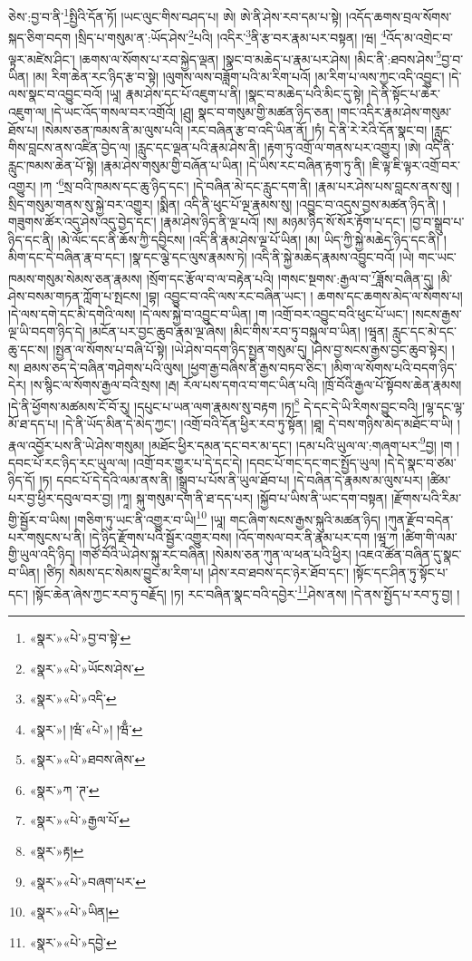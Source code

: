 ཅེས་:བྱ་བ་ནི་\footnote{«སྣར་»«པེ་»བྱ་བ་སྟེ་}སྤྱིའི་དོན་ཏོ། །ཡང་ལུང་གིས་བཤད་པ། ཨེ། ཨེ་ནི་ཤེས་རབ་དམ་པ་སྟེ། །འདོད་ཆགས་བྲལ་སོགས་སྐད་ཅིག་བདག །སྲིད་པ་གསུམ་ན་:ཡོད་ཤེས་\footnote{«སྣར་»«པེ་»ཡོངས་ཤེས་}པའི། །འདིར་\footnote{«སྣར་»«པེ་»འདི་}ནི་རྩ་བར་རྣམ་པར་བསྟན། །ཝ། \footnote{«སྣར་»། །ཝཾ་«པེ་»། །ཝྃ་}འོད་མ་འགྲེང་བ་ལྟར་མཛེས་ཤིང་། །ཆགས་ལ་སོགས་པ་རབ་སྐྱེད་ལྡན། །སྣང་བ་མཆེད་པ་རྣམ་པར་ཤེས། །མིང་ནི་:ཐབས་ཤེས་\footnote{«སྣར་»«པེ་»ཐབས་ཞེས་}བྱ་བ་ཡིན། །མ། རིག་ཆེན་རང་ཉིད་རྩ་བ་སྟེ། །ལུགས་ལས་བཟློག་པའི་མ་རིག་པའོ། །མ་རིག་པ་ལས་ཀྱང་འདི་འབྱུང་། །དེ་ལས་སྣང་བ་འབྱུང་བའོ། །ཡཱ། རྣམ་ཤེས་དང་པོ་འཇུག་པ་ནི། །སྣང་བ་མཆེད་པའི་མིང་དུ་སྟེ། །དེ་ནི་སྟོང་པ་ཆེར་འཇུག་ལ། །དེ་ཡང་འོད་གསལ་བར་འགྲོའོ། །ཤྲུ། སྣང་བ་གསུམ་གྱི་མཚན་ཉིད་ཅན། །གང་འདིར་རྣམ་ཤེས་གསུམ་ཐོས་པ། །སེམས་ཅན་ཁམས་ནི་མ་ལུས་པའི། །རང་བཞིན་རྩ་བ་འདི་ཡིན་ནོ། །ཏཾ། དེ་ནི་རེ་རེའི་དོན་སྣང་བ། །རླུང་གིས་བླངས་ནས་འཛིན་བྱེད་ལ། །རླུང་དང་ལྡན་པའི་རྣམ་ཤེས་ནི། །རྟག་ཏུ་འགྲོ་ལ་གནས་པར་འགྱུར། །ཨེ། འདི་ནི་རླུང་ཁམས་ཆེན་པོ་སྟེ། །རྣམ་ཤེས་གསུམ་གྱི་བཞོན་པ་ཡིན། །དེ་ཡིས་རང་བཞིན་རྟག་ཏུ་ནི། །ཇི་ལྟ་ཇི་ལྟར་འགྲོ་བར་འགྱུར། །ཀ ་\footnote{«སྣར་»ཀ ་ཊ་}སྲ་བའི་ཁམས་དང་ཆུ་ཉིད་དང་། །དེ་བཞིན་མེ་དང་རླུང་དག་ནི། །རྣམ་པར་ཤེས་པས་བླངས་ནས་སུ། །སྲིད་གསུམ་གནས་སུ་སྐྱེ་བར་འགྱུར། །སྨིན། འདི་ནི་ཕུང་པོ་ལྔ་རྣམས་སུ། །འབྱུང་བ་འདུས་བྱས་མཚན་ཉིད་ནི། །གཟུགས་ཚོར་འདུ་ཤེས་འདུ་བྱེད་དང་། །རྣམ་ཤེས་ཉིད་ནི་ལྔ་པའོ། །ས། མཉམ་ཉིད་སོ་སོར་རྟོག་པ་དང་། །བྱ་བ་སྒྲུབ་པ་ཉིད་དང་ནི། །མེ་ལོང་དང་ནི་ཆོས་ཀྱི་དབྱིངས། །འདི་ནི་རྣམ་ཤེས་ལྔ་པོ་ཡིན། །མ། ཡིད་ཀྱི་སྐྱེ་མཆེད་ཉིད་དང་ནི། །མིག་དང་དེ་བཞིན་རྣ་བ་དང་། །སྣ་དང་ལྕེ་དང་ལུས་རྣམས་ཏེ། །འདི་ནི་སྐྱེ་མཆེད་རྣམས་འབྱུང་བའོ། །ཡེ། གང་ཡང་ཁམས་གསུམ་སེམས་ཅན་རྣམས། །སྲོག་དང་རྩོལ་བ་ལ་བརྟེན་པའི། །གསང་སྔགས་:རྒྱལ་བ་\footnote{«སྣར་»«པེ་»རྒྱལ་པོ་}ཟློས་བཞིན་དུ། །མི་ཤེས་བསམ་གཏན་ཀློག་པ་སྤངས། །བྷ། འབྱུང་བ་འདི་ལས་རང་བཞིན་ཡང་། །
ཆགས་དང་ཆགས་མེད་ལ་སོགས་པ། །དེ་ལས་དགེ་དང་མི་དགེའི་ལས། །དེ་ལས་སྐྱེ་བ་འབྱུང་བ་ཡིན། །ག །འགྲོ་བར་འབྱུང་བའི་ཕུང་པོ་ཡང་། །སངས་རྒྱས་ལྔ་ཡི་བདག་ཉིད་དེ། །མངོན་པར་བྱང་ཆུབ་རྣམ་ལྔ་ཞེས། །མིང་གིས་རབ་ཏུ་བསྐུལ་བ་ཡིན། །ཝཱན། རླུང་དང་མེ་དང་ཆུ་དང་ས། །སྤྱན་ལ་སོགས་པ་བཞི་པོ་སྟེ། །ཡེ་ཤེས་བདག་ཉིད་སྤྱན་གསུམ་དུ། །ཤེས་བྱ་སངས་རྒྱས་བྱང་ཆུབ་སྟེར། །ས། ཐམས་ཅད་དེ་བཞིན་གཤེགས་པའི་ལུས། །ཕྱག་རྒྱ་བཞིས་ནི་རྒྱས་བཏབ་ཅིང་། །མིག་ལ་སོགས་པའི་བདག་ཉིད་དེར། །ས་སྙིང་ལ་སོགས་རྒྱལ་བའི་སྲས། །རྦ། རོལ་པས་དགའ་བ་གང་ཡིན་པའི། །ཁྲོ་བོའི་རྒྱལ་པོ་སྟོབས་ཆེན་རྣམས། །དེ་ནི་ཕྱོགས་མཚམས་ངོ་བོ་རུ། །དཔུང་པ་ཡན་ལག་རྣམས་སུ་བརྟག །ཏ།\footnote{«སྣར་»རྟ།} དེ་དང་དེ་ཡི་རིགས་བྱུང་བའི། །ལྷ་དང་ལྷ་མོ་ཐ་དད་པ། །དེ་ནི་ཡོད་མིན་དེ་མེད་ཀྱང་། །འགྲོ་བའི་དོན་ཕྱིར་རབ་ཏུ་སྟོན། །ཐཱ། དེ་བས་གཉིས་མེད་མཐོང་བ་ཡི། །རྣལ་འབྱོར་པས་ནི་ཡེ་ཤེས་གསུམ། །མཐོང་ཕྱིར་དམན་དང་བར་མ་དང་། །དམ་པའི་ཡུལ་ལ་:གཞག་པར་\footnote{«སྣར་»«པེ་»བཞག་པར་}བྱ། །ག །དབང་པོ་རང་ཉིད་རང་ཡུལ་ལ། །འགྲོ་བར་གྱུར་པ་དེ་དང་དེ། །དབང་པོ་གང་དང་གང་སྤྱོད་ཡུལ། །དེ་དེ་སྣང་བ་ཙམ་ཉིད་དོ། །ཏ། དབང་པོ་དེ་དེའི་ལམ་ནས་ནི། །སྒྲུབ་པ་པོས་ནི་ཡུལ་ཐོབ་པ། །དེ་བཞིན་དེ་རྣམས་མ་ལུས་པར། །ཚིམ་པར་བྱ་ཕྱིར་དབུལ་བར་བྱ། །ཀཱ། སྐུ་གསུམ་དག་ནི་ཐ་དད་པར། །སྐྱོབ་པ་ཡིས་ནི་ཡང་དག་བསྟན། །རྫོགས་པའི་རིམ་གྱི་སྦྱོར་བ་ཡིས། །གཅིག་ཏུ་ཡང་ནི་འགྱུར་བ་ཡི།\footnote{«སྣར་»«པེ་»ཡིན།} །ཡཱ། གང་ཞིག་སངས་རྒྱས་སྐུའི་མཚན་ཉིད། །ཀུན་རྫོབ་བདེན་པར་གསུངས་པ་ནི། །དེ་ཉིད་རྫོགས་པའི་སྦྱོར་འགྱུར་བས། །འོད་གསལ་བར་ནི་རྣམ་པར་དག །ཝཱ་ཀ །ཚིག་གི་ལམ་གྱི་ཡུལ་འདི་ཉིད། །གཙོ་བོའི་ཡེ་ཤེས་སྐུ་རང་བཞིན། །སེམས་ཅན་ཀུན་ལ་ཕན་པའི་ཕྱིར། །འཇའ་ཚོན་བཞིན་དུ་སྣང་བ་ཡིན། །ཙིཏ། སེམས་དང་སེམས་བྱུང་མ་རིག་པ། །ཤེས་རབ་ཐབས་དང་ཉེར་ཐོབ་དང་། །སྟོང་དང་ཤིན་ཏུ་སྟོང་པ་དང་། །སྟོང་ཆེན་ཞེས་ཀྱང་རབ་ཏུ་བརྗོད། །ཏ། རང་བཞིན་སྣང་བའི་དབྱེར་\footnote{«སྣར་»«པེ་»དབྱེ་}ཤེས་ནས། །དེ་ནས་སྤྱོད་པ་རབ་ཏུ་བྱ། །
